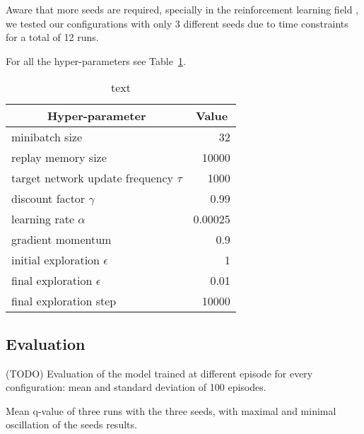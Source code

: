 Aware that more seeds are required, specially in the reinforcement learning field \cite{DBLP:journals/corr/abs-1709-06560}, we tested our configurations with only 3 different seeds due to time constraints for a total of 12 runs.

For all the hyper-parameters see Table~\ref{tab:my-hyperparams}.

\begin{table}[]
	\centering
	\begin{tabular}{|l|r|}
		\hline
		\multicolumn{1}{|c|}{\textbf{Hyper-parameter}} &
		\multicolumn{1}{|c|}{\textbf{Value}}        \\
		\hline
		minibatch size & 32 \\
		replay memory size & 10000 \\
		target network update frequency $\tau$ & 1000 \\
		discount factor $\gamma$ & 0.99 \\
		learning rate $\alpha$ & 0.00025 \\
		gradient momentum & 0.9 \\
		initial exploration $\epsilon$ & 1 \\
		final exploration $\epsilon$ & 0.01 \\
		final exploration step & 10000 \\
		\hline
	\end{tabular}
	
	\caption{text}
	\label{tab:my-hyperparams}
\end{table}



\subsection{Evaluation}

(TODO)
Evaluation of the model trained at different episode for every configuration:
mean and standard deviation of 100 episodes.

Mean q-value of three runs with the three seeds, with maximal and minimal oscillation of the seeds results.



